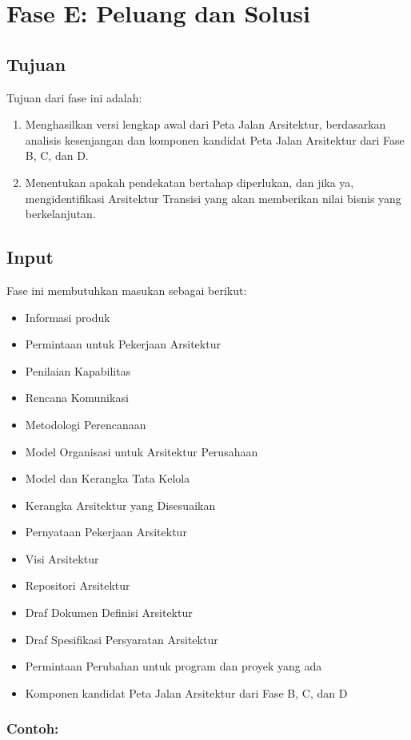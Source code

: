 \chapter{Fase E: Peluang dan Solusi}

\section{Tujuan}
Tujuan dari fase ini adalah:
\begin{enumerate}
	\item Menghasilkan versi lengkap awal dari Peta Jalan Arsitektur, berdasarkan analisis kesenjangan dan komponen kandidat Peta Jalan Arsitektur dari Fase B, C, dan D.
	\item Menentukan apakah pendekatan bertahap diperlukan, dan jika ya, mengidentifikasi Arsitektur Transisi yang akan memberikan nilai bisnis yang berkelanjutan.
\end{enumerate}

\section{Input}
Fase ini membutuhkan masukan sebagai berikut:
\begin{itemize}
	\item Informasi produk
	\item Permintaan untuk Pekerjaan Arsitektur
	\item Penilaian Kapabilitas
	\item Rencana Komunikasi
	\item Metodologi Perencanaan
	\item Model Organisasi untuk Arsitektur Perusahaan
	\item Model dan Kerangka Tata Kelola
	\item Kerangka Arsitektur yang Disesuaikan
	\item Pernyataan Pekerjaan Arsitektur
	\item Visi Arsitektur
	\item Repositori Arsitektur
	\item Draf Dokumen Definisi Arsitektur
	\item Draf Spesifikasi Persyaratan Arsitektur
	\item Permintaan Perubahan untuk program dan proyek yang ada
	\item Komponen kandidat Peta Jalan Arsitektur dari Fase B, C, dan D
\end{itemize}

\subsection*{Contoh:}

